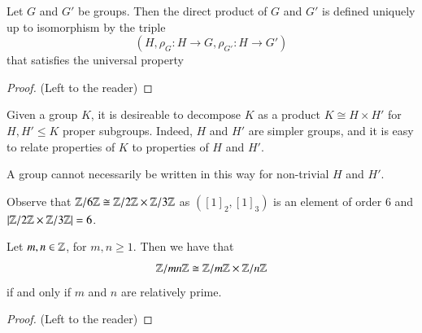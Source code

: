 \documentclass[12pt, a4paper, oneside, openright, titlepage]{book}
\begin{document}
\begin{namthm}
        Let $G$ and $G'$ be groups. Then the direct product of $G$ and $G'$ is defined uniquely up to isomorphism by the triple \begin{equation}
                (H,\rho_G:H\rightarrow G, \rho_{G'}:H\rightarrow G')
        \end{equation}
        that satisfies the universal property \begin{center}
        \end{center}
\end{namthm}
\begin{proof}
        (Left to the reader)
\end{proof}


\begin{rmk}
        Given a group $K$, it is desireable to decompose $K$ as a product $K \cong H \times H'$ for $H,H' \leq K$ proper subgroups. Indeed, $H$ and $H'$ are simpler groups, and it is easy to relate properties of $K$ to properties of $H$ and $H'$.
\end{rmk}


\begin{note}
        A group cannot necessarily be written in this way for non-trivial $H$ and $H'$.
\end{note}


\begin{eg}
        Observe that $\mathbb Z/6\mathbb Z \cong \mathbb Z/2\mathbb Z \times \mathbb Z/3\mathbb Z$ as $([1]_2,[1]_3)$ is an element of order $6$ and $|\mathbb Z/2\mathbb Z\times \mathbb Z/3\mathbb Z| = 6$.
\end{eg}

\begin{prop}
        Let $m,n \in \mathbb Z$, for $m,n \geq 1$. Then we have that \begin{equation}
                \mathbb Z/mn\mathbb Z \cong \mathbb Z/m\mathbb Z\times \mathbb Z/n\mathbb Z
        \end{equation}
        if and only if $m$ and $n$ are relatively prime.
\end{prop}
\begin{proof}
        (Left to the reader)
\end{proof}
\end{document}
